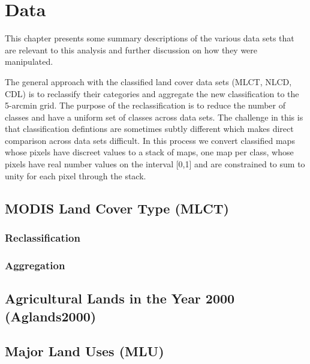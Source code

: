 
\chapter{Data}
\label{cha:data}

This chapter presents some summary descriptions of the various data sets that are relevant to this analysis and further discussion on how they were manipulated.

The general approach with the classified land cover data sets (MLCT, NLCD, CDL) is to reclassify their categories and aggregate the new classification to the 5-arcmin grid.  The purpose of the reclassification is to reduce the number of classes and have a uniform set of classes across data sets.  The challenge in this is that classification defintions are sometimes subtly different which makes direct comparison across data sets difficult.  In this process we convert classified maps whose pixels have discreet values to a stack of maps, one map per class, whose pixels have real number values on the interval [0,1] and are constrained to sum to unity for each pixel through the stack.


\section{MODIS Land Cover Type (MLCT)}
\label{sec:mlct}

\subsection{Reclassification}
\label{sec:mlct-reclass}


\subsection{Aggregation}
\label{sec:mlct-aggr}



\section{Agricultural Lands in the Year 2000 (Aglands2000)}
\label{sec:aglands2000}

\section{Major Land Uses (MLU)}
\label{sec:mlu}


